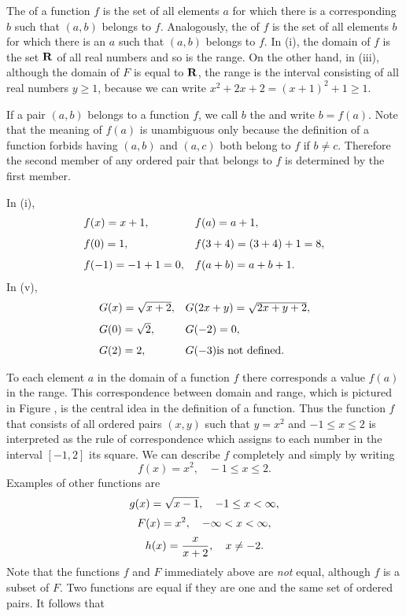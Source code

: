 The  of a function $f$ is the set of all elements $a$
for which there is a corresponding $b$
such that $(a, b)$ belongs to $f$.
Analogously, the  of $f$ is the set of all elements $b$
for which there is an $a$
such that $(a, b)$ belongs to $f$.
In (i),
the domain of $f$ is the set $\mathrm{\bf R}$ of all real numbers and so is the range.
On the other hand, in (iii),
although the domain of $F$ is equal to $\mathrm{\bf R}$,
the range is the interval consisting of all real numbers $y \geq 1$,
because we can write $x^2 + 2x + 2 = (x + 1)^2 + 1 \geq 1$.

If a pair $(a, b)$ belongs to a function $f$,
we call $b$ the  and write $b = f(a)$.
Note that the meaning of $f(a)$ is unambiguous
only because the definition of a function
forbids having $(a, b)$ and $(a, c)$ both belong to $f$ if $b \neq c$.
Therefore the second member of any ordered pair that belongs to $f$
is determined by the first member.

\begin{example}
\label{exam 1.2.5}
In (i),
\[
\begin{array}{ll}
f(x) = x + 1,                &f(a) = a + 1, \vspace{.1in}\\
f(0) = 1,                      &f(3 + 4) = (3 + 4) + 1 = 8, \vspace{.1in}\\
f(-1) = -1 + 1 = 0,       &f(a + b) = a + b + 1 .
\end{array}
\]
In (v),
\[
\begin{array}{ll}
G(x) = \sqrt{x + 2},       &G(2x + y) = \sqrt{2x + y + 2}, \vspace{.1in}\\
G(0) = \sqrt2,               &G(-2) = 0, \vspace{.1in}\\
G(2) = 2,                      &G(-3) \mbox{is not defined} .
\end{array}
\]
\end{example}

To each element $a$ in the domain of a function $f$
there corresponds a value $f(a)$ in the range.
This correspondence between domain and range,
which is pictured in Figure ,
is the central idea in the definition of a function.
Thus the function $f$ that consists of all ordered pairs $(x, y)$
such that $y = x^2$ and $-1 \leq x \leq 2$
is interpreted as the rule of correspondence
which assigns to each number in the interval $[-1, 2]$ its square.
We can describe $f$ completely and simply by writing
\[
f(x) = x^2,       \;\;\;     -1 \leq x \leq 2.
\]
Examples of other functions are
\[
g(x) = \sqrt{x - 1}, \quad -1 \leq x < \infty,
\]
\[
F(x) = x^2, \quad -\infty < x < \infty,
\]
\[
h(x) = \frac{x}{x + 2}, \quad x \neq -2 .
\]
Note that the functions $f$ and $F$ immediately above
are \emph{not} equal,
although $f$ is a subset of $F$.
Two functions are equal
if they are one and the same set of ordered pairs.
It follows that

